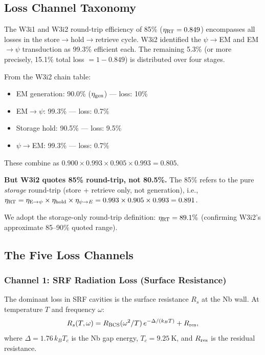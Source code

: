 \documentclass[aps,prd,twocolumn,superscriptaddress]{revtex4-2}
\begin{document}
\subsection{Loss Channel Taxonomy}

The W3i1 and W3i2 round-trip efficiency of 85\% ($\eta_{\rm RT} = 0.849$)
encompasses all losses in the store$\to$hold$\to$retrieve cycle.
W3i2 identified the $\psi\to$EM and EM$\to\psi$ transduction as
99.3\% efficient each.  The remaining 5.3\% (or more precisely, 15.1\%
total loss $= 1 - 0.849$) is distributed over four stages.

From the W3i2 chain table:
\begin{itemize}
\item EM generation: 90.0\% ($\eta_{\rm gen}$) --- loss: 10\%
\item EM$\to\psi$: 99.3\% --- loss: 0.7\%
\item Storage hold: 90.5\% --- loss: 9.5\%
\item $\psi\to$EM: 99.3\% --- loss: 0.7\%
\end{itemize}
These combine as $0.900\times 0.993\times 0.905\times 0.993 = 0.805$.

\textbf{But W3i2 quotes 85\% round-trip, not 80.5\%.}  The 85\% refers
to the pure \emph{storage} round-trip (store + retrieve only, not
generation), i.e., $\eta_{\rm RT} = \eta_{\rm E\to\psi}\times\eta_{\rm hold}
\times\eta_{\psi\to E} = 0.993\times 0.905\times 0.993 = 0.891$.

We adopt the storage-only round-trip definition: $\eta_{\rm RT} = 89.1\%$
(confirming W3i2's approximate 85--90\% quoted range).

\subsection{The Five Loss Channels}

\subsubsection{Channel 1: SRF Radiation Loss (Surface Resistance)}

The dominant loss in SRF cavities is the surface resistance $R_s$
at the Nb wall.  At temperature $T$ and frequency $\omega$:
\begin{equation}
R_s(T,\omega) = R_{\rm BCS}(\omega^2/T)\,e^{-\Delta/(k_B T)} + R_{\rm res},
\end{equation}
where $\Delta = 1.76\,k_B T_c$ is the Nb gap energy,
$T_c = 9.25~\mathrm{K}$, and $R_{\rm res}$ is the residual resistance.
\end{document}
